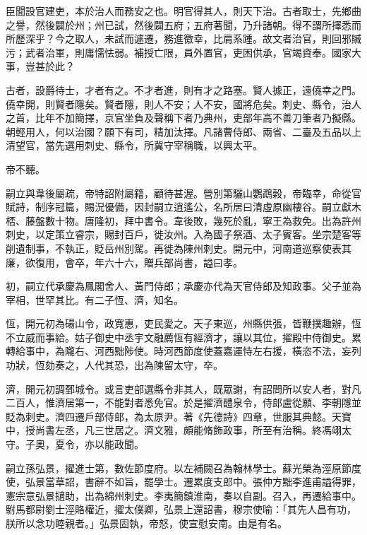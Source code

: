 \begin{pinyinscope}
 臣聞設官建吏，本於治人而務安之也。明官得其人，則天下治。古者取士，先鄉曲之譽，然後闢於州；州已試，然後闢五府；五府著聞，乃升諸朝。得不謂所擇悉而所歷深乎？今之取人，未試而遽遷，務進徼幸，比肩系踵。故文者治官，則回邪贓污；武者治軍，則庸懦怯弱。補授亡限，員外置官，吏困供承，官竭資奉。國家大事，豈甚於此？



 古者，設爵待士，才者有之。不才者進，則有才之路塞。賢人據正，遠僥幸之門。僥幸開，則賢者隱矣。賢者隱，則人不安；人不安，國將危矣。刺史、縣令，治人之首，比年不加簡擇，京官坐負及聲稱下者乃典州，吏部年高不善刀筆者乃擬縣。朝輕用人，何以治國？願下有司，精加汰擇。凡諸曹侍郎、兩省、二臺及五品以上清望官，當先選用刺史、縣令，所冀守宰稱職，以興太平。



 帝不聽。



 嗣立與韋後屬疏，帝特詔附屬籍，顧待甚渥。營別第驪山鸚鵡穀，帝臨幸，命從官賦詩，制序冠篇，賜況優備，因封嗣立逍遙公，名所居曰清虛原幽棲谷。嗣立獻木桮、藤盤數十物。唐隆初，拜中書令。韋後敗，幾死於亂，寧王為救免。出為許州刺史，以定策立睿宗，賜封百戶，徙汝州。入為國子祭酒、太子賓客。坐宗楚客等削遺制事，不執正，貶岳州別駕。再徙為陳州刺史。開元中，河南道巡察使表其廉，欲復用，會卒，年六十六，贈兵部尚書，謚曰孝。



 初，嗣立代承慶為鳳閣舍人、黃門侍郎；承慶亦代為天官侍郎及知政事。父子並為宰相，世罕其比。有二子恆、濟，知名。



 恆，開元初為碭山令，政寬惠，吏民愛之。天子東巡，州縣供張，皆鞭撲趣辦，恆不立威而事給。姑子御史中丞宇文融薦恆有經濟才，讓以其位，擢殿中侍御史。累轉給事中，為隴右、河西黜陟使。時河西節度使蓋嘉運恃左右援，橫恣不法，妄列功狀，恆劾奏之，人代其恐，出為陳留太守，卒。



 濟，開元初調鄄城令。或言吏部選縣令非其人，既眾謝，有詔問所以安人者，對凡二百人，惟濟居第一，不能對者悉免官。於是擢濟醴泉令，侍郎盧從願、李朝隱並貶為刺史。濟四遷戶部侍郎，為太原尹。著《先德詩》四章，世服其典懿。天寶中，授尚書左丞，凡三世居之。濟文雅，頗能脩飾政事，所至有治稱。終馮翊太守。子奧，夏令，亦以能政聞。



 嗣立孫弘景，擢進士第，數佐節度府。以左補闕召為翰林學士。蘇光榮為涇原節度使，弘景當草詔，書辭不如旨，罷學士。遷累度支郎中。張仲方黜李進甫謚得罪，憲宗意弘景擿助，出為綿州刺史。李夷簡鎮淮南，奏以自副。召入，再遷給事中。駙馬都尉劉士涇賂權近，擢太僕卿，弘景上還詔書，穆宗使喻：「其先人昌有功，朕所以念功睦親者。」弘景固執，帝怒，使宣慰安南。由是有名。




\end{pinyinscope}
